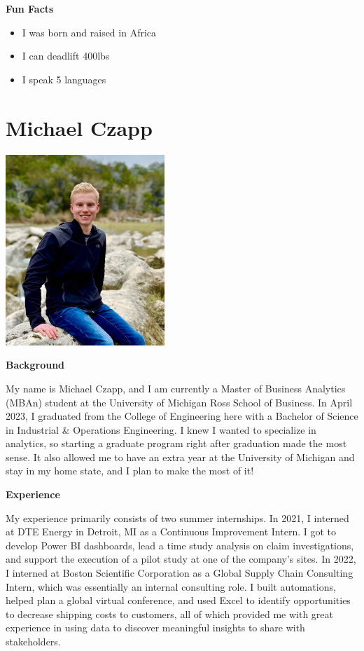 \documentclass[
]{book}
\begin{document}
\textbf{Fun Facts}

\begin{itemize}
\item
  I was born and raised in Africa
\item
  I can deadlift 400lbs
\item
  I speak 5 languages
\end{itemize}

\hypertarget{michael-czapp}{%
\section{Michael Czapp}\label{michael-czapp}}

\includegraphics[width=2.36458in,height=\textheight]{Michael Czapp Photo.jpeg}

\textbf{Background}

My name is Michael Czapp, and I am currently a Master of Business Analytics (MBAn) student at the University of Michigan Ross School of Business. In April 2023, I graduated from the College of Engineering here with a Bachelor of Science in Industrial \& Operations Engineering. I knew I wanted to specialize in analytics, so starting a graduate program right after graduation made the most sense. It also allowed me to have an extra year at the University of Michigan and stay in my home state, and I plan to make the most of it!

\textbf{Experience}

My experience primarily consists of two summer internships. In 2021, I interned at DTE Energy in Detroit, MI as a Continuous Improvement Intern. I got to develop Power BI dashboards, lead a time study analysis on claim investigations, and support the execution of a pilot study at one of the company's sites. In 2022, I interned at Boston Scientific Corporation as a Global Supply Chain Consulting Intern, which was essentially an internal consulting role. I built automations, helped plan a global virtual conference, and used Excel to identify opportunities to decrease shipping costs to customers, all of which provided me with great experience in using data to discover meaningful insights to share with stakeholders.
\end{document}
